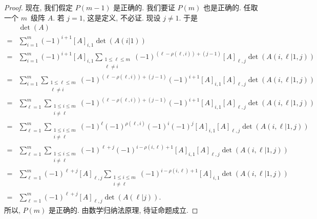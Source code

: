\begin{proof}
    现在, 我们假定 \(P(m-1)\) 是正确的.
    我们要证 \(P(m)\) 也是正确的.
    任取一个 \(m\)~级阵 \(A\).
    若 \(j = 1\), 这是定义, 不必证.
    现设 \(j \neq 1\).
    于是
    \begin{align*}
             & \det {(A)}                  \\
        = {} &
        \sum_{i = 1}^{m} {
        (-1)^{i+1} [A]_{i,1} \det {(A(i|1))}
        }
        \tag*{(1)}
        \\
        = {} &
        \sum_{i = 1}^{m} {
        (-1)^{i+1} [A]_{i,1}
        \sum_{\substack{1 \leq \ell \leq m \\ \ell \neq i}} {
        (-1)^{(\ell - \rho(\ell, i)) + (j - 1)}
            [A]_{\ell,j} \det {(A({i,\ell}|{1,j}))}
        }
        }
        \tag*{(2)}
        \\
        = {} &
        \sum_{i = 1}^{m} {
        \sum_{\substack{1 \leq \ell \leq m \\ \ell \neq i}} {
        (-1)^{(\ell - \rho(\ell, i)) + (j - 1)}
        (-1)^{i+1}
            [A]_{i,1} [A]_{\ell,j} \det {(A({i,\ell}|{1,j}))}
        }
        }
        \tag*{(3)}
        \\
        = {} &
        \sum_{\ell = 1}^{m} {
        \sum_{\substack{1 \leq i \leq m    \\ i \neq \ell}} {
        (-1)^{(\ell - \rho(\ell, i)) + (j - 1)}
        (-1)^{i+1}
            [A]_{i,1} [A]_{\ell,j} \det {(A({i,\ell}|{1,j}))}
        }
        }
        \tag*{(4)}
        \\
        = {} &
        \sum_{\ell = 1}^{m} {
        \sum_{\substack{1 \leq i \leq m    \\ i \neq \ell}} {
        (-1)^{\ell} (-1)^{\rho(\ell, i)} (-1)^{i} (-1)^{j}
            [A]_{i,1} [A]_{\ell,j} \det {(A({i,\ell}|{1,j}))}
        }
        }
        \tag*{(5)}
        \\
        = {} &
        \sum_{\ell = 1}^{m} {
        \sum_{\substack{1 \leq i \leq m    \\ i \neq \ell}} {
        (-1)^{\ell + j} (-1)^{i - \rho(i, \ell) + 1}
            [A]_{i,1} [A]_{\ell,j} \det {(A({i,\ell}|{1,j}))}
        }
        }
        \tag*{(6)}
        \\
        = {} &
        \sum_{\ell = 1}^{m} {(-1)^{\ell + j} [A]_{\ell,j}
        \sum_{\substack{1 \leq i \leq m    \\ i \neq \ell}} {
        (-1)^{i - \rho(i, \ell) + 1}
            [A]_{i,1} \det {(A({i,\ell}|{1,j}))}
        }
        }
        \tag*{(7)}
        \\
        = {} &
        \sum_{\ell = 1}^{m} {(-1)^{\ell + j} [A]_{\ell,j}
        \det {(A(\ell|j))}
        }.
        \tag*{(8)}
    \end{align*}
    所以, \(P(m)\) 是正确的.
    由数学归纳法原理, 待证命题成立.


\end{proof}
